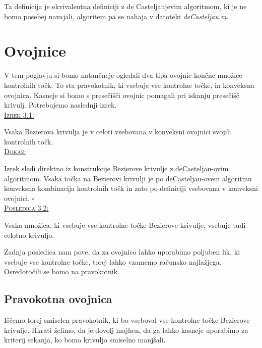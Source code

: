 \documentclass[a4paper, 12pt]{article} %
\newenvironment{matematika}[1]{
{\underline{\textsc{#1:}}}
}{
}
\begin{document}
Ta definicija je ekvivalentna definiciji z de Casteljaujevim algoritmom, ki je ne bomo posebej navajali, algoritem pa se nahaja v datoteki \emph{deCasteljau.m}.
\section{Ovojnice}

V tem poglavju si bomo natančneje ogledali dva tipa ovojnic končne množice kontrolnih točk. To sta pravokotnik, ki vsebuje vse kontrolne točke, in konveksna ovojnica. Kasneje si bomo s presečišči ovojnic pomagali pri iskanju presečišč krivulj. Potrebujemo naslednji izrek.\\
\begin{matematika}{Izrek 3.1}
Vsaka Bezierova krivulja je v celoti vsebovana v konveksni ovojnici svojih kontrolnih točk.\\
\end{matematika}
\begin{matematika}{Dokaz}
Izrek sledi direktno iz konstrukcije Bezierove krivulje z deCasteljau-ovim algoritmom. Vsaka točka na Bezierovi krivulji je po deCasteljau-ovem algoritmu konveksna kombinacija kontrolnih točk in zato po definiciji vsebovana v konveksni ovojnici. \hspace*{\fill} $\square$\\
\end{matematika}
\begin{matematika}{Posledica 3.2}
Vsaka množica, ki vsebuje vse kontrolne točke Bezierove krivulje, vsebuje tudi celotno krivuljo.
\end{matematika}

Zadnja posledica nam pove, da za ovojnico lahko uporabimo poljuben lik, ki vsebuje vse kontrolne točke, torej lahko vzamemo računsko najlažjega. Osredotočili se bomo na pravokotnik.

\subsection{Pravokotna ovojnica}
Iščemo torej smiselen pravokotnik, ki bo vseboval vse kontrolne točke Bezierove krivulje. Hkrati želimo, da je dovolj majhen, da ga lahko kasneje uporabimo za kriterij sekanja, ko bomo krivuljo smiselno manjšali.
\end{document}
